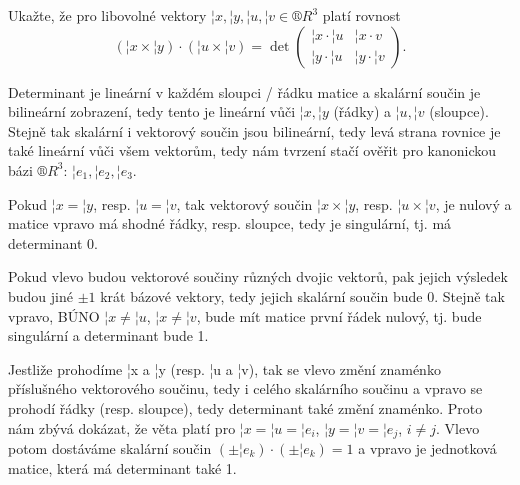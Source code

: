 \documentclass[12pt]{article}                   %
\begin{document}
\begin{priklad}[4.1]

    \begin{reseni}
    \end{reseni}
\end{priklad}

\pagebreak

\begin{priklad}[4.2]
    Ukažte, že pro libovolné vektory $¦x, ¦y, ¦u, ¦v \in ®R^3$ platí rovnost
    $$ (¦x \times ¦y)·(¦u \times ¦v) = \det \begin{pmatrix} ¦x·¦u & ¦x·v \\ ¦y·¦u & ¦y·¦v \end{pmatrix}. $$

    \begin{dukazin}
        Determinant je lineární v každém sloupci / řádku matice a skalární součin je bilineární zobrazení, tedy tento je lineární vůči $¦x, ¦y$ (řádky) a $¦u, ¦v$ (sloupce). Stejně tak skalární i vektorový součin jsou bilineární, tedy levá strana rovnice je také lineární vůči všem vektorům, tedy nám tvrzení stačí ověřit pro kanonickou bázi $®R^3$: $¦e_1, ¦e_2, ¦e_3$.

        Pokud $¦x = ¦y$, resp. $¦u = ¦v$, tak vektorový součin $¦x \times ¦y$, resp. $¦u \times ¦v$, je nulový a matice vpravo má shodné řádky, resp. sloupce, tedy je singulární, tj. má determinant 0.

        Pokud vlevo budou vektorové součiny různých dvojic vektorů, pak jejich výsledek budou jiné $±1$ krát bázové vektory, tedy jejich skalární součin bude 0. Stejně tak vpravo, BÚNO $¦x ≠ ¦u$, $¦x ≠ ¦v$, bude mít matice první řádek nulový, tj. bude singulární a determinant bude 1.

        Jestliže prohodíme ¦x a ¦y (resp. ¦u a ¦v), tak se vlevo změní znaménko příslušného vektorového součinu, tedy i celého skalárního součinu a vpravo se prohodí řádky (resp. sloupce), tedy determinant také změní znaménko. Proto nám zbývá dokázat, že věta platí pro $¦x = ¦u = ¦e_i$, $¦y = ¦v = ¦e_j$, $i ≠ j$. Vlevo potom dostáváme skalární součin $(±¦e_k)·(±¦e_k) = 1$ a vpravo je jednotková matice, která má determinant také 1.
    \end{dukazin}
\end{priklad}

\pagebreak

\begin{priklad}[4.3]
    \begin{dukazin}
    \end{dukazin}
\end{priklad}
\end{document}

